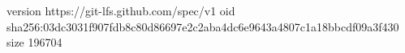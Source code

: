 version https://git-lfs.github.com/spec/v1
oid sha256:03dc3031f907fdb8c80d86697e2c2aba4dc6e9643a4807c1a18bbcdf09a3f430
size 196704
